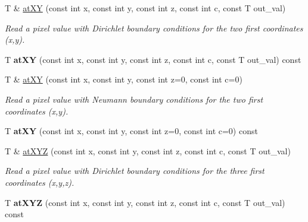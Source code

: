 \begin{DoxyCompactItemize}
\item 
\hypertarget{structcimg__library_1_1CImg_a5beac60ab3aec04b1a06591805c8d60b}{
T \& \hyperlink{structcimg__library_1_1CImg_a5beac60ab3aec04b1a06591805c8d60b}{atXY} (const int x, const int y, const int z, const int c, const T out\_\-val)}
\label{structcimg__library_1_1CImg_a5beac60ab3aec04b1a06591805c8d60b}

\begin{DoxyCompactList}\small\item\em Read a pixel value with Dirichlet boundary conditions for the two first coordinates ({\ttfamily x},{\ttfamily y}). \item\end{DoxyCompactList}\item 
\hypertarget{structcimg__library_1_1CImg_add3891d5b48276545d1bb2fc6830c9d5}{
T {\bfseries atXY} (const int x, const int y, const int z, const int c, const T out\_\-val) const }
\label{structcimg__library_1_1CImg_add3891d5b48276545d1bb2fc6830c9d5}

\item 
\hypertarget{structcimg__library_1_1CImg_a28cb25c0c37e2d221f508d873b15d491}{
T \& \hyperlink{structcimg__library_1_1CImg_a28cb25c0c37e2d221f508d873b15d491}{atXY} (const int x, const int y, const int z=0, const int c=0)}
\label{structcimg__library_1_1CImg_a28cb25c0c37e2d221f508d873b15d491}

\begin{DoxyCompactList}\small\item\em Read a pixel value with Neumann boundary conditions for the two first coordinates ({\ttfamily x},{\ttfamily y}). \item\end{DoxyCompactList}\item 
\hypertarget{structcimg__library_1_1CImg_aecef357e61ab8145518209fc4a316729}{
T {\bfseries atXY} (const int x, const int y, const int z=0, const int c=0) const }
\label{structcimg__library_1_1CImg_aecef357e61ab8145518209fc4a316729}

\item 
\hypertarget{structcimg__library_1_1CImg_a217f6f77350d320cbd5f6028889bb20b}{
T \& \hyperlink{structcimg__library_1_1CImg_a217f6f77350d320cbd5f6028889bb20b}{atXYZ} (const int x, const int y, const int z, const int c, const T out\_\-val)}
\label{structcimg__library_1_1CImg_a217f6f77350d320cbd5f6028889bb20b}

\begin{DoxyCompactList}\small\item\em Read a pixel value with Dirichlet boundary conditions for the three first coordinates ({\ttfamily x},{\ttfamily y},{\ttfamily z}). \item\end{DoxyCompactList}\item 
\hypertarget{structcimg__library_1_1CImg_a41db5a73cd2a0d9938f8ca94ef9481cb}{
T {\bfseries atXYZ} (const int x, const int y, const int z, const int c, const T out\_\-val) const }
\label{structcimg__library_1_1CImg_a41db5a73cd2a0d9938f8ca94ef9481cb}


\end{DoxyCompactItemize}
